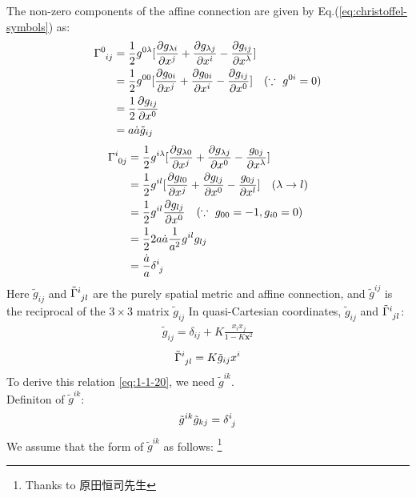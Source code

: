 \documentclass[11pt]{ltjsarticle}
\theoremstyle{plain}
\theoremstyle{break}
\newcommand{\mbfx}{\mathbf{x}}
\newcommand{\tensorGamma}[1]{\tensor{\Gamma}{ #1}}
\begin{document}
The non-zero components of the affine connection are given by Eq.(\ref{eq:christoffel-symbols}) as:
\begin{align}
  \tensorGamma{^{0}_{ij}}
  &=\frac{1}{2}g^{0\lambda}[\frac{\partial g_{\lambda i}}{\partial x^j} + \frac{\partial g_{\lambda j}}{\partial x^i} -\frac{\partial g_{ij}}{\partial x^\lambda}] \\
  &=\frac{1}{2} g^{00}[\frac{\partial g_{0i}}{\partial x^j} + \frac{\partial g_{0i}}{\partial x^i} -\frac{\partial g_{ij}}{\partial x^0}]\quad(\because\,\,g^{0i}=0)\\
  &=\frac{1}{2} \frac{\partial g_{ij}}{\partial x^0}\\
  &=a \dot{a} \tilde{g}_{ij}
\end{align}
\begin{align}
  \tensorGamma{^{i}_{0j}}
  &=\frac{1}{2}g^{i \lambda}[\frac{\partial g_{\lambda 0}}{\partial x^j}+\frac{\partial g_{\lambda j}}{\partial x^0} -\frac{g_{0j}}{\partial x^\lambda}] \\
  &=\frac{1}{2}g^{i l}[\frac{\partial g_{l 0}}{\partial x^j}+\frac{\partial g_{l j}}{\partial x^0} -\frac{g_{0j}}{\partial x^l}]\quad(\lambda \to l)\\
  &=\frac{1}{2}g^{i l}\frac{\partial g_{lj}}{\partial x^0} \quad(\because\,\,g_{00}=-1,g_{i0}=0)\\
  &=\frac{1}{2} 2 a \dot{a}\frac{1}{a^2}g^{il}g_{lj}\\
  &=\frac{\dot{a}}{a} \tensor{\delta}{^i_j}
\end{align}%
Here $\tilde{g}_{ij}$ and $\tensor{\tilde{\Gamma}}{^{i}_{jl}}$ are the purely spatial metric and affine connection, and  $\tilde{g}^{ij}$ is the reciprocal of the $3\times3$ matrix $\tilde{g}_{ij}$
In quasi-Cartesian coordinates, $\tilde{g}_{ij}$ and $\tensor{\tilde{\Gamma}}{^{i}_{jl}}$:
\begin{align}
\tilde{g}_{ij} = \delta_{ij} + K \frac{x_i x_j}{1-K\mbfx^2}
\end{align}
\begin{align}
\tensor{\tilde{\Gamma}}{^{i}_{jl}} = K \tilde{g}_{ij} x^i \label{eq:1-1-20}
\end{align}%
To derive this relation \eqref{eq:1-1-20}, we need $\tilde{g}^{ik}$.\\
Definiton of $\tilde{g}^{ik}$:
\begin{align}
\tilde{g}^{ik}\tilde{g}_{kj} = \tensor{\delta}{^i_j}
\end{align}%
We assume that the form of $\tilde{g}^{ik}$ as follows: \footnote{Thanks to 原田恒司先生}
\end{document}
